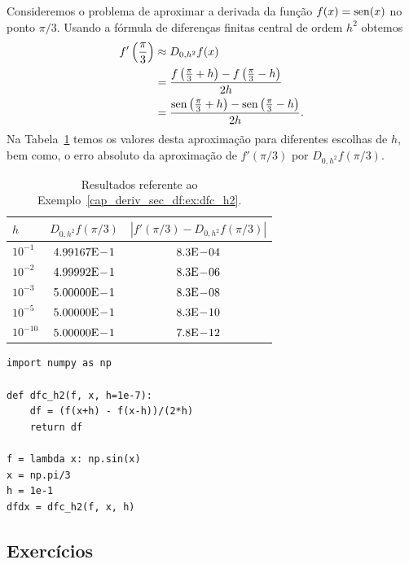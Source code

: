 \begin{ex}\label{cap_deriv_sec_df:ex:dfc_h2}
  Consideremos o problema de aproximar a derivada da função $f(x) = \operatorname{sen}(x)$ no ponto $\pi/3$. Usando a fórmula de diferenças finitas central de ordem $h^2$ obtemos
  \begin{subequations}
    \begin{align}
      f'\left(\frac{\pi}{3}\right) &\approx D_{0,h^2}f(x) \\
                                   &= \frac{f\left(\frac{\pi}{3}+h\right)-f\left(\frac{\pi}{3}-h\right)}{2h}\\
                                   &= \frac{\operatorname{sen}\left(\frac{\pi}{3}+h\right)-\operatorname{sen}\left(\frac{\pi}{3}-h\right)}{2h}. 
  \end{align}
\end{subequations}
Na Tabela~\ref{cap_deriv_sec_df:tab:ex_dfc_h2} temos os valores desta aproximação para diferentes escolhas de $h$, bem como, o erro absoluto da aproximação de $f'(\pi/3)$ por $D_{0,h^2}f(\pi/3)$.

\begin{table}[h!]
  \centering
  \caption{Resultados referente ao Exemplo~\ref{cap_deriv_sec_df:ex:dfc_h2}.}
  \begin{tabular}{l|c|c}
    $h$ & $D_{0,h^2}f(\pi/3)$ & $|f'(\pi/3)-D_{0,h^2}f(\pi/3)|$\\ \hline
    $10^{-1}$ & $4.99167\mathrm{E}\!-\!1$ & $8.3\mathrm{E}\!-\!04$ \\
    $10^{-2}$ & $4.99992\mathrm{E}\!-\!1$ & $8.3\mathrm{E}\!-\!06$ \\
    $10^{-3}$ & $5.00000\mathrm{E}\!-\!1$ & $8.3\mathrm{E}\!-\!08$ \\
    $10^{-5}$ & $5.00000\mathrm{E}\!-\!1$ & $8.3\mathrm{E}\!-\!10$ \\
    $10^{-10}$ & $5.00000\mathrm{E}\!-\!1$ & $7.8\mathrm{E}\!-\!12$ \\\hline
  \end{tabular}
  \label{cap_deriv_sec_df:tab:ex_dfc_h2}
\end{table}


\begin{lstlisting}[caption=dfc\_h2.py]
import numpy as np

def dfc_h2(f, x, h=1e-7):
    df = (f(x+h) - f(x-h))/(2*h)
    return df

f = lambda x: np.sin(x)
x = np.pi/3
h = 1e-1
dfdx = dfc_h2(f, x, h)
\end{lstlisting}
\end{ex}

\subsection*{Exercícios}

